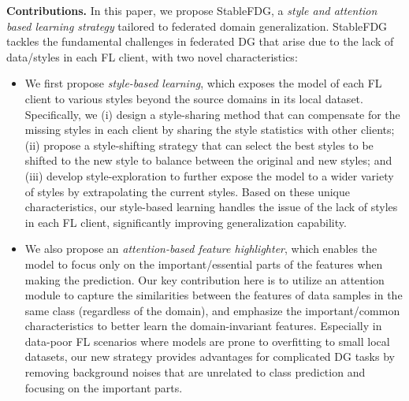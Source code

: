 \documentclass{article}
\theoremstyle{plain}
\theoremstyle{definition}
\theoremstyle{remark}
\begin{document}
 \textbf{Contributions.} In this paper, we propose StableFDG, a \textit{style and attention based learning strategy} tailored to federated domain generalization.    StableFDG  tackles the fundamental challenges in federated DG that arise due to the lack of data/styles in each FL client, with two novel characteristics:%
 \begin{itemize}
\vspace{-1mm}
\item  We first propose \textit{style-based learning},  which exposes the  model  of each FL client to various styles beyond the source domains  in its local dataset. %
 Specifically, we (i) design a style-sharing method that can compensate for the missing styles in each client by sharing the style statistics with other clients; (ii) propose a style-shifting strategy that can select the best styles to be shifted to the new style to balance between the original and new styles; and (iii) develop style-exploration to further expose the model to a wider variety of styles by extrapolating the current styles. Based on these unique characteristics, our style-based learning handles the issue of the lack of styles in each FL client, significantly improving   generalization capability. %


\item   We also propose an \textit{attention-based feature highlighter}, which  enables  the  model to focus  only on the important/essential parts of the features when making the prediction. Our key contribution here is to utilize an attention module to  capture the similarities between the features of data samples in the same class (regardless of the domain), and emphasize the important/common characteristics to better learn the domain-invariant features.  Especially in data-poor FL scenarios where models are prone to overfitting to small local datasets,  our new strategy  provides  advantages   for   complicated DG  tasks by removing background noises that are unrelated to class prediction and focusing on the important parts.  
\end{itemize}
\end{document}
